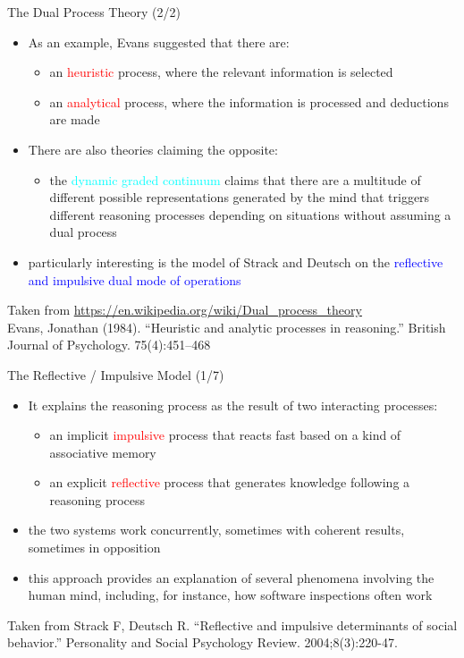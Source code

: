 \documentclass{beamer}
\begin{document}
\begin{frame}
{\centerline{The Dual Process Theory (2/2)}}
\begin{itemize}
   \item As an example, Evans suggested that there are:
         \begin{itemize}
   \item an \textcolor{red}{heuristic} process, where the relevant information is selected
   \item an \textcolor{red}{analytical} process, where the information is processed and deductions are made
   \end{itemize}  
   \item There are also theories claiming the opposite:
   \begin{itemize}
   \item the \textcolor{cyan}{dynamic graded continuum} claims that there are a multitude of different possible representations generated by the mind that triggers different reasoning processes depending on situations without assuming a dual process
   \end{itemize}  
   \item particularly interesting is the model of Strack and Deutsch on the \textcolor{blue}{reflective and impulsive dual mode of operations}
   \end{itemize} 
\begin{center}
    \tiny{Taken from \url{https://en.wikipedia.org/wiki/Dual_process_theory}\\Evans, Jonathan (1984). ``Heuristic and analytic processes in reasoning.'' British Journal of Psychology. 75(4):451–468}
\end{center}

\end{frame}

\begin{frame}
{\centerline{The Reflective / Impulsive Model (1/7)}}
\begin{itemize}
\item It explains the reasoning process as the result of two interacting processes:
\begin{itemize}
\item an implicit \textcolor{red}{impulsive} process that reacts fast based on a kind of associative memory
\item an explicit \textcolor{red}{reflective} process that generates knowledge following a reasoning process
   \end{itemize} 
\item the two systems work concurrently, sometimes with coherent results, sometimes in opposition
\item this approach provides an explanation of several phenomena involving the human mind, including, for instance, how software inspections often work 
   \end{itemize} 
\begin{center}
    \tiny{Taken from Strack F, Deutsch R. ``Reflective and impulsive determinants of social behavior.'' Personality and Social Psychology Review. 2004;8(3):220-47.}
\end{center}

\end{frame}
\end{document}
